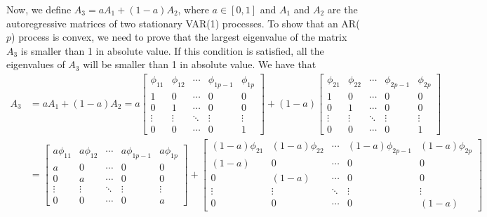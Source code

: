 \documentclass{article}
\begin{document}
Now, we define $A_3 = aA_1 + (1 - a)A_2$, where $a \in [0, 1]$ and $A_1$ and $A_2$ are the autoregressive matrices of two stationary VAR(1) processes. To show that an AR($p$) process is convex, we need to prove that the largest eigenvalue of the matrix $A_3$ is smaller than 1 in absolute value. If this condition is satisfied, all the eigenvalues of $A_3$ will be smaller than 1 in absolute value. We have that
\begin{align*}
A_3 &= aA_1 + (1 - a)A_2 = a
\begin{bmatrix}
    \phi_{11} & \phi_{12} & \cdots & \phi_{1p-1} & \phi_{1p}    \\
    1 & 0 & \cdots & 0 & 0 \\     
    0 & 1 & \cdots & 0 & 0 \\
    \vdots & \vdots & \ddots & \vdots & \vdots\\
    0 & 0 & \cdots & 0 & 1
\end{bmatrix} 
+ (1 - a)
\begin{bmatrix}
    \phi_{21} & \phi_{22} & \cdots & \phi_{2p-1} & \phi_{2p}    \\
    1 & 0 & \cdots & 0 & 0 \\     
    0 & 1 & \cdots & 0 & 0 \\
    \vdots & \vdots & \ddots & \vdots & \vdots\\
    0 & 0 & \cdots & 0 & 1
\end{bmatrix} \\
&= 
\begin{bmatrix}
   a \phi_{11} & a \phi_{12} & \cdots & a \phi_{1p-1} & a \phi_{1p}    \\
    a & 0 & \cdots & 0 & 0 \\     
    0 & a & \cdots & 0 & 0 \\
    \vdots & \vdots & \ddots & \vdots & \vdots\\
    0 & 0 & \cdots & 0 & a
\end{bmatrix} 
+
\begin{bmatrix}
    (1 - a) \phi_{21} & (1 - a) \phi_{22} & \cdots & (1 - a) \phi_{2p-1} & (1 - a) \phi_{2p}    \\
    (1 - a) & 0 & \cdots & 0 & 0 \\     
    0 & (1 - a) & \cdots & 0 & 0 \\
    \vdots & \vdots & \ddots & \vdots & \vdots\\
    0 & 0 & \cdots & 0 & (1 - a)
\end{bmatrix}
\end{align*}
\end{document}
